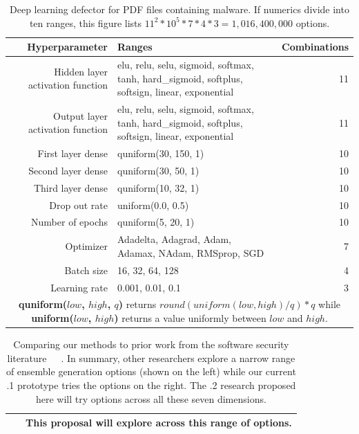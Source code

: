 \documentclass{NSF}
\newcommand{\IT}{{\sffamily {\em MASS~CONFUSION}}}
\begin{document}
\begin{nsfdescription}
 
\begin{table} \caption{Deep learning defector for  PDF files containing malware. If numerics divide into ten ranges,  this figure lists   
$11^2*10^5*7*4*3=1,016,400,000$ options.}
 \label{tbl:hyperparameters}
 \scriptsize
 \begin{tabular}{r|l|r}
\hline
\rowcolor[HTML]{ECF4FF} 
\textbf{Hyperparameter} &   \bf{Ranges} & {\bf Combinations}\\ \hline
 Hidden layer  activation function & elu, relu, selu, sigmoid, softmax,  tanh, hard\_sigmoid, softplus, softsign,   linear, exponential & 11 \\  
 Output layer  activation function &  elu, relu, selu, sigmoid, softmax,  tanh, hard\_sigmoid, softplus, softsign,   linear, exponential  & 11 \\  
First layer dense & quniform(30, 150, 1) & 10 \\  
Second layer dense & quniform(30, 50, 1) & 10\\  
Third layer dense & quniform(10, 32, 1) & 10\\  
Drop out rate & uniform(0.0, 0.5) & 10\\  
Number of epochs & quniform(5, 20, 1) & 10 \\  
 Optimizer &  Adadelta, Adagrad, Adam, Adamax, NAdam, RMSprop, SGD  & 7\\  
Batch size & 16, 32, 64, 128  & 4\\  
Learning rate & 0.001, 0.01, 0.1 & 3 \\\hline
\multicolumn{3}{c}{\textbf{quniform($low$, $high$, $q$)} returns  $round(uniform(low, high)/q)*q$
while \textbf{uniform($low$, $high$)} returns a value uniformly between $low$ and $high$.}
  \end{tabular}
\end{table}\begin{table}
 \caption{Comparing our methods to prior
 work from the software security literature~\cite{DBLP:conf/iclr/TramerKPGBM18}~\cite{DBLP:conf/icml/PangXDCZ19}~\cite{DBLP:journals/corr/abs-1709-03423}. In summary, other researchers explore a narrow range of ensemble generation options (shown on the   left) while our current {\IT}.1 prototype tries the options on the right.
The {\IT}.2
research proposed here  will try options
across all these seven dimensions.}\label{tbl:methods}
\footnotesize
\begin{tabular}{|r|c|p{1in}|l|p{5cm}|}\cline{3-5}
\multicolumn{2}{c}{~}&\multicolumn{3}{|c|}{This proposal will explore across this range of options.}\\\hline

\end{tabular}
\end{table}
\end{nsfdescription}
\end{document}
